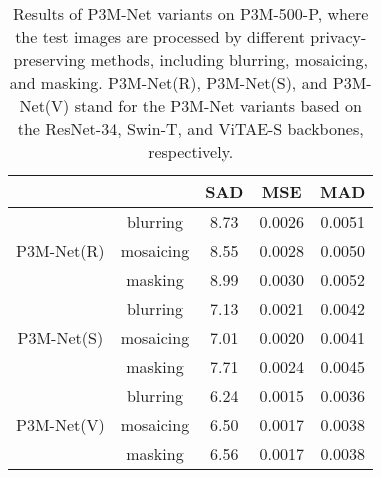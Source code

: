 \documentclass[twocolumn]{svjour3}
\begin{document}
\begin{table}[htb]
\begin{center}
\begin{tabular}{c|c|ccc}
\hline
& & SAD & MSE & MAD \\
\hline
& blurring & 8.73 & 0.0026 & 0.0051 \\
P3M-Net(R) & mosaicing &8.55 & 0.0028 & 0.0050 \\
& masking &8.99 & 0.0030 & 0.0052 \\
\hline
& blurring & 7.13 & 0.0021 & 0.0042 \\
P3M-Net(S) & mosaicing & 7.01 & 0.0020 & 0.0041 \\
& masking & 7.71 & 0.0024 & 0.0045 \\
\hline
& blurring & 6.24 & 0.0015 & 0.0036 \\
P3M-Net(V) & mosaicing & 6.50 & 0.0017 & 0.0038 \\
& masking & 6.56 & 0.0017 & 0.0038 \\
\hline
\end{tabular}
\end{center}
\caption{Results of P3M-Net variants on P3M-500-P, where the test images are processed by different privacy-preserving methods, including blurring, mosaicing, and masking. P3M-Net(R), P3M-Net(S), and P3M-Net(V) stand for the P3M-Net variants based on the ResNet-34, Swin-T, and ViTAE-S backbones, respectively.}
\label{tab:experiment-p3m-different-obfuscation}
\end{table}
\end{document}

